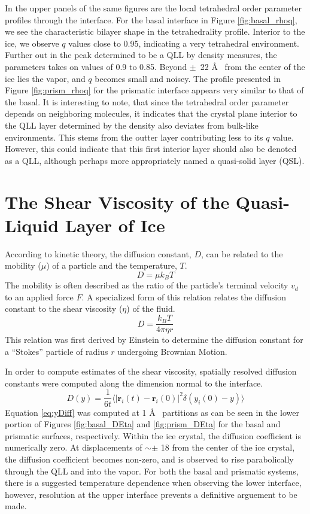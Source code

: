 In the upper panels of the same figures are the local tetrahedral
order parameter profiles through the interface. For the basal
interface in Figure \ref{fig:basal_rhoq}, we see the characteristic
bilayer shape in the tetrahedrality profile. Interior to the ice, we
observe $q$ values close to 0.95, indicating a very tetrahedral
environment. Further out in the peak determined to be a QLL by density
measures, the parameters takes on values of 0.9 to 0.85. Beyond
$\pm$~22 \AA~ from the center of the ice lies the vapor, and $q$
becomes small and noisey. The profile presented in Figure
\ref{fig:prism_rhoq} for the prismatic interface appears very similar
to that of the basal. It is interesting to note, that since the
tetrahedral order parameter depends on neighboring molecules, it
indicates that the crystal plane interior to the QLL layer determined
by the density also deviates from bulk-like environments. This stems
from the outter layer contributing less to its $q$ value. However,
this could indicate that this first interior layer should also be
denoted as a QLL, although perhaps more appropriately named a
quasi-solid layer (QSL). 



\section{The Shear Viscosity of the Quasi-Liquid Layer of Ice}
According to kinetic theory, the diffusion constant, $D$, can be
related to the mobility ($\mu$) of a particle and the temperature,
$T$.
\begin{equation}
D = \mu k_B T
\end{equation}
The mobility is often described as the ratio of the particle's
terminal velocity $v_d$ to an applied force $F$. A specialized form of
this relation relates the diffusion constant to the shear viscosity
($\eta$) of the fluid.
\begin{equation}\label{eq:stokes-einst}
D = \frac{k_BT}{4\pi \eta r}
\end{equation}
This relation was first derived by Einstein to determine the diffusion
constant for a ``Stokes'' particle of radius $r$ undergoing Brownian
Motion.

In order to compute estimates of the shear viscosity, spatially
resolved diffusion constants were computed along the dimension normal
to the interface.
\begin{equation}\label{eq:yDiff}
D(y) = \frac{1}{6t} \langle | \mathbf{r}_i(t) - \mathbf{r}_i(0) |^2
\delta(y_i(0) - y)  \rangle 
\end{equation}
Equation \eqref{eq:yDiff} was computed at 1 \AA~ partitions as can be
seen in the lower portion of Figures \ref{fig:basal_DEta} and
\ref{fig:prism_DEta} for the basal and prismatic surfaces,
respectively. Within the ice crystal, the diffusion coefficient is
numerically zero. At displacements of $\sim \pm$ 18 from the center of
the ice crystal, the diffusion coefficient becomes non-zero, and is
observed to rise parabolically through the QLL and into the
vapor. For both the basal and prismatic systems, there is a suggested
temperature dependence when observing the lower interface, however,
resolution at the upper interface prevents a definitive arguement to
be made. 

